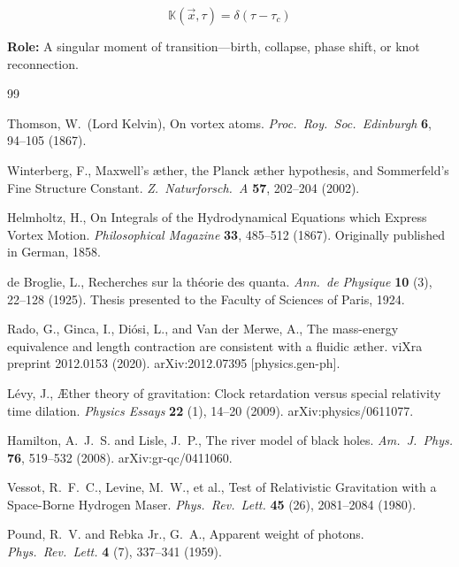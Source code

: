 \documentclass[a4paper,12pt]{article}
\begin{document}
\[
\mathbb{K}(\vec{x}, \tau) = \delta(\tau - \tau_c)
\]

\textbf{Role:} A singular moment of transition—birth, collapse, phase shift, or knot reconnection.


\begin{thebibliography}{99}

Thomson, W.~(Lord Kelvin),
\newblock On vortex atoms.
\newblock \textit{Proc.\ Roy.\ Soc.\ Edinburgh} \textbf{6}, 94--105 (1867).

Winterberg, F.,
\newblock Maxwell's \ae ther, the Planck \ae ther hypothesis, and Sommerfeld's Fine Structure Constant.
\newblock \textit{Z.\ Naturforsch.\ A} \textbf{57}, 202--204 (2002).

Helmholtz, H.,
\newblock On Integrals of the Hydrodynamical Equations which Express Vortex Motion.
\newblock \textit{Philosophical Magazine} \textbf{33}, 485--512 (1867).
\newblock Originally published in German, 1858.

de Broglie, L.,
\newblock Recherches sur la th\'eorie des quanta.
\newblock \textit{Ann.\ de Physique} \textbf{10} (3), 22--128 (1925).
\newblock Thesis presented to the Faculty of Sciences of Paris, 1924.

Rado, G., Ginca, I., Di\'osi, L., and Van der Merwe, A.,
\newblock The mass-energy equivalence and length contraction are consistent with a fluidic \ae ther.
\newblock viXra preprint 2012.0153 (2020).
\newblock arXiv:2012.07395 [physics.gen-ph].

L\'evy, J.,
\newblock \AE ther theory of gravitation: Clock retardation versus special relativity time dilation.
\newblock \textit{Physics Essays} \textbf{22} (1), 14--20 (2009).
\newblock arXiv:physics/0611077.

Hamilton, A.~J.~S. and Lisle, J.~P.,
\newblock The river model of black holes.
\newblock \textit{Am.\ J.\ Phys.} \textbf{76}, 519--532 (2008).
\newblock arXiv:gr-qc/0411060.

Vessot, R.~F.~C., Levine, M.~W., et al.,
\newblock Test of Relativistic Gravitation with a Space-Borne Hydrogen Maser.
\newblock \textit{Phys.\ Rev.\ Lett.} \textbf{45} (26), 2081--2084 (1980).

Pound, R.~V. and Rebka Jr., G.~A.,
\newblock Apparent weight of photons.
\newblock \textit{Phys.\ Rev.\ Lett.} \textbf{4} (7), 337--341 (1959).


\end{thebibliography}
\end{document}

